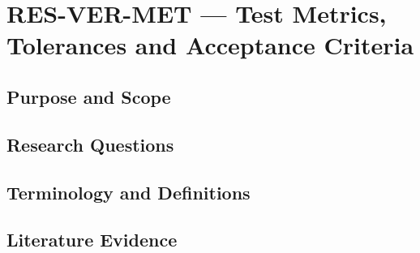 
\section{RES-VER-MET --- Test Metrics, Tolerances and Acceptance Criteria}
\label{sec:res-ver-met}

\subsection{Purpose and Scope}
\label{sec:res-ver-met-purpose}


\subsection{Research Questions}
\label{sec:res-ver-met-research-questions}


\subsection{Terminology and Definitions}
\label{sec:res-ver-met-definitions}


\subsection{Literature Evidence}
\label{sec:res-ver-met-literature-evidence}

%

